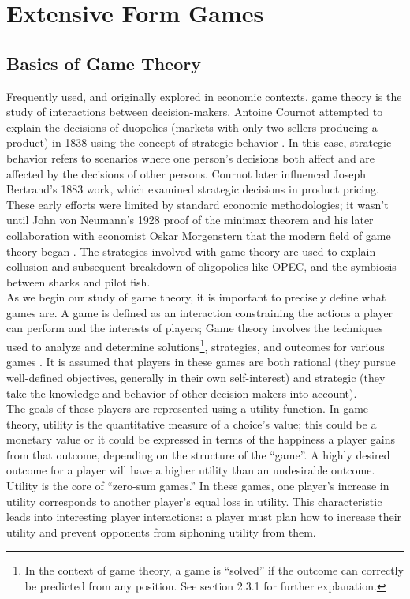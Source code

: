 \chapter{Extensive Form Games}
\section{Basics of Game Theory}
Frequently used, and originally explored in economic contexts, game theory is the study of interactions between decision-makers. Antoine Cournot attempted to explain the decisions of duopolies (markets with only two sellers producing a product) in 1838 using the concept of strategic behavior \cite{webs14}. In this case, strategic behavior refers to scenarios where one person's decisions both affect and are affected by the decisions of other persons. Cournot later influenced Joseph Bertrand's 1883 work, which examined strategic decisions in product pricing. These early efforts were limited by standard economic methodologies; it wasn't until John von Neumann's 1928 proof of the minimax theorem and his later collaboration with economist Oskar Morgenstern that the modern field of game theory began \cite{webs14}. The strategies involved with game theory are used to explain collusion and subsequent breakdown of oligopolies like OPEC, and the symbiosis between sharks and pilot fish.\\

As we begin our study of game theory, it is important to precisely define what games are. A game is defined as an interaction constraining the actions a player can perform and the interests of players; Game theory involves the techniques used to analyze and determine solutions\footnote{In the context of game theory, a game is ``solved'' if the outcome can correctly be predicted from any position. See section 2.3.1 for further explanation.}, strategies, and outcomes for various games \cite{osbo94}. It is assumed that players in these games are both rational (they pursue well-defined objectives, generally in their own self-interest) and strategic (they take the knowledge and behavior of other decision-makers into account)\cite{osbo94}.\\

The goals of these players are represented using a utility function. In game theory, utility is the quantitative measure of a choice's value; this could be a monetary value or it could be expressed in terms of the happiness a player gains from that outcome, depending on the structure of the ``game''. A highly desired outcome for a player will have a higher utility than an undesirable outcome. Utility is the core of ``zero-sum games.'' In these games, one player's increase in utility corresponds to another player's equal loss in utility. This characteristic leads into interesting player interactions: a player must plan how to increase their utility and prevent opponents from siphoning utility from them.

